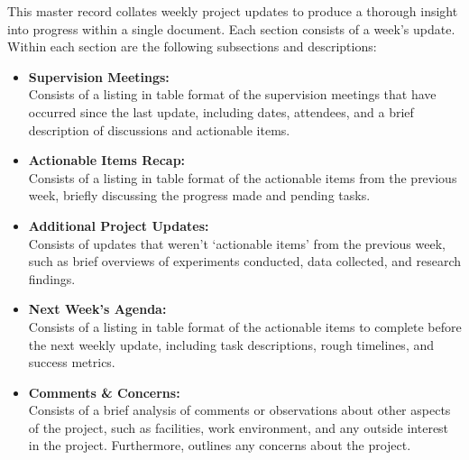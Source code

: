 This master record collates weekly project updates to produce a thorough insight into progress within a single document. Each section consists of a week's update. Within each section are the following subsections and descriptions:
\begin{itemize}
    \item \textbf{Supervision Meetings:}\\Consists of a listing in table format of the supervision meetings that have occurred since the last update, including dates, attendees, and a brief description of discussions and actionable items.
    \item \textbf{Actionable Items Recap:}\\Consists of a listing in table format of the actionable items from the previous week, briefly discussing the progress made and pending tasks.
    \item \textbf{Additional Project Updates:}\\Consists of updates that weren't `actionable items' from the previous week, such as brief overviews of experiments conducted, data collected, and research findings.
    \item \textbf{Next Week's Agenda:}\\Consists of a listing in table format of the actionable items to complete before the next weekly update, including task descriptions, rough timelines, and success metrics.
    \item \textbf{Comments \& Concerns:}\\Consists of a brief analysis of comments or observations about other aspects of the project, such as facilities, work environment, and any outside interest in the project. Furthermore, outlines any concerns about the project.
\end{itemize}